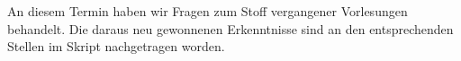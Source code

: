 
An diesem Termin haben wir Fragen zum Stoff vergangener Vorlesungen behandelt. Die daraus neu gewonnenen Erkenntnisse sind an den entsprechenden Stellen im Skript nachgetragen worden.
